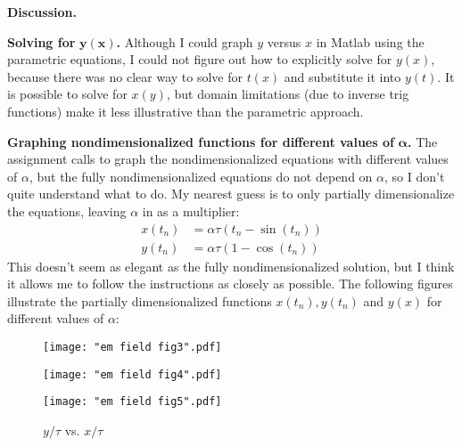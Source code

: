 \documentclass{article}
\begin{document}
\textbf{Discussion.}

\textbf{Solving for }$\boldsymbol{y(x)}$\textbf{.} Although I could graph $y$ versus $x$ in Matlab using the parametric equations, I could not figure out how to explicitly solve for $y(x)$, because there was no clear way to solve for $t(x)$ and substitute it into $y(t)$. It is possible to solve for $x(y)$, but domain limitations (due to inverse trig functions) make it less illustrative than the parametric approach.

\textbf{Graphing nondimensionalized functions for different values of} $\boldsymbol{\alpha}$\textbf{.}
The assignment calls to graph the nondimensionalized equations with different values of $\alpha$, but the fully nondimensionalized equations do not depend on $\alpha$, so I don't quite understand what to do. My nearest guess is to only partially dimensionalize the equations, leaving $\alpha$ in as a multiplier:
\[
\begin{aligned}
x(t_n) &= \alpha \tau(t_n - \sin(t_n)) \\
y(t_n) &= \alpha \tau(1 - \cos(t_n))
\end{aligned}
\]
This doesn't seem as elegant as the fully nondimensionalized solution, but I think it allows me to follow the instructions as closely as possible. The following figures illustrate the partially dimensionalized functions $x(t_n), y(t_n)$ and $y(x)$ for different values of $\alpha$:
\begin{figure}[H]
\centering
\begin{minipage}{.5\textwidth}
    \centering
    \texttt{[image: "em field fig3".pdf]}
\end{minipage}%
\begin{minipage}{.5\textwidth}
    \centering
    \texttt{[image: "em field fig4".pdf]}
\end{minipage}
\end{figure}
\begin{figure}[H]
\centering
\texttt{[image: "em field fig5".pdf]}
\caption{$y/\tau$ vs. $x/\tau$ \label{5figure}}
\end{figure}
\end{document}
